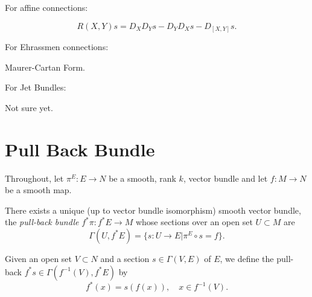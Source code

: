 \documentclass{amsart}
\begin{document}
For affine connections:

\begin{defn}
\[
R(X, Y) s = D_X D_Y s - D_Y D_X s - D_{[X, Y]} s.
\]
\end{defn}

For Ehrassmen connections:

\begin{defn}
Maurer-Cartan Form.
\end{defn}

For Jet Bundles:

\begin{defn}
Not sure yet.
\end{defn}

\section{Pull Back Bundle}

Throughout, let \(\pi^E : E \to N\) be a smooth, rank \(k\), vector bundle and let \(f : M \to N\) be a smooth map.

\begin{lemma}
There exists a unique (up to vector bundle isomorphism) smooth vector bundle, the \emph{pull-back bundle} \(f^{\ast} \pi : f^{\ast}E \to M\) whose sections over an open set \(U  \subset M\) are
\[
\Gamma(U, f^{\ast} E) = \{s : U \to E | \pi^E \circ s = f\}.
\]
\end{lemma}

\begin{defn}
Given an open set \(V \subset N\) and a section \(s \in \Gamma(V, E)\) of \(E\), we define the pull-back \(f^{\ast} s \in \Gamma(f^{-1}(V), f^{\ast} E)\) by
\[
f^{\ast} (x) = s(f(x)), \quad x \in f^{-1}(V).
\]
\end{defn}
\end{document}
